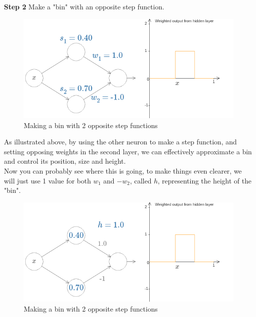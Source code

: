 \documentclass{article}
\begin{document}
\textbf{Step 2} Make a "bin" with an opposite step function.
\begin{figure}[H]
    \centering
    \includegraphics[width=.6\textwidth]{figures/bin.png}
    \caption{Making a bin with 2 opposite step functions}
\end{figure}
As illustrated above, by using the other neuron to make a step function, and setting opposing weights in the second layer, we can effectively approximate a bin and control its position, size and height. \\
Now you can probably see where this is going, to make things even clearer, we will just use 1 value for both $w_1$ and $-w_2$, called $h$, representing the height of the "bin".
\begin{figure}[H]
    \centering
    \includegraphics[width=.6\textwidth]{figures/bin_h.png}
    \caption{Making a bin with 2 opposite step functions}
\end{figure}
\end{document}
